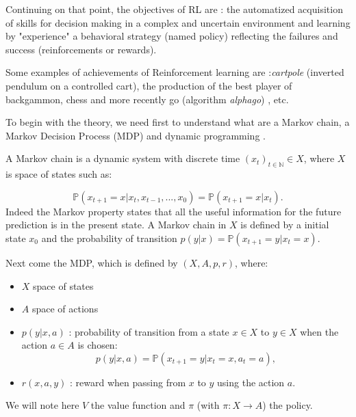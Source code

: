 \documentclass[conference]{IEEEtran}
\begin{document}
Continuing on that point, the objectives of RL are : the automatized acquisition of skills for decision making in a complex and uncertain environment and learning by "experience" a behavioral strategy (named policy) reflecting the failures and success (reinforcements or rewards).

Some examples of achievements of Reinforcement learning are :\textit{cartpole} (inverted pendulum on a controlled cart), the production of the best player of backgammon, chess and more recently go (algorithm \textit{alphago}) \cite{silver2016mastering}, etc.

To begin with the theory, we need first to understand what are a Markov chain, a Markov Decision Process (MDP) and dynamic programming \cite{MUNOS1}.

A Markov chain is a dynamic system with discrete time $(x_t)_{t\in\mathbb{N}} \in X$, where $X$ is space of states such as:

\begin{equation*}
\mathbb{P}(x_{t+1}=x|x_t,x_{t-1},...,x_0)=\mathbb{P}(x_{t+1}=x|x_t).
\end{equation*}
Indeed the Markov property states that all the useful information for the future prediction is in the present state. 
A Markov chain in $X$ is defined by a initial state $x_0$ and the probability of transition $p(y|x)=\mathbb{P}(x_{t+1}=y|x_t=x)$.

Next come the MDP, which is defined by $(X,A,p,r)$, where:
\begin{itemize}
 \item $X$ space of states
 \item $A$ space of actions
 \item $p(y|x,a)$ : probability of transition from a state $x \in X$ to $y \in X$ when the action $a \in A$ is chosen:
 \begin{equation*}
 p(y|x,a) = \mathbb{P}(x_{t+1}=y|x_t=x,a_t=a),
 \end{equation*}
 \item $r(x,a,y)$ : reward when passing from $x$ to $y$ using the action $a$.
\end{itemize}
We will note here $V$ the value function and $\pi$ (with $\pi: X \rightarrow A$) the policy.\\
\end{document}
